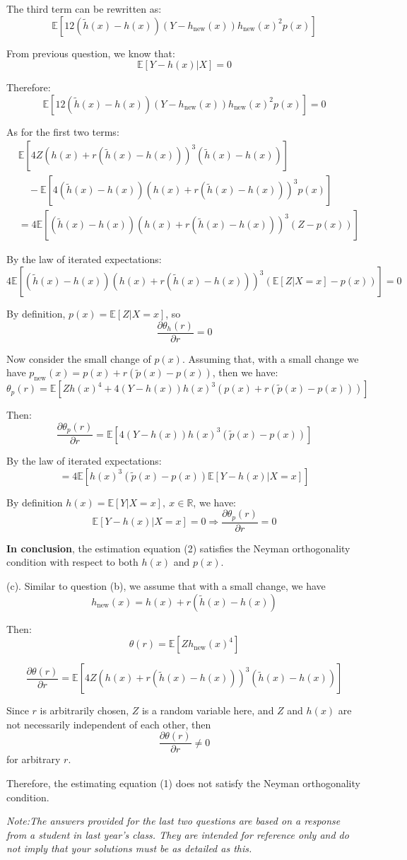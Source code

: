 \documentclass{article}
\begin{document}
The third term can be rewritten as:  
\[
\mathbb{E}[12(\tilde{h}(x) - h(x))(Y - h_{\text{new}}(x)) h_{\text{new}}(x)^2 p(x)]
\]

From previous question, we know that:  
\[
\mathbb{E}[Y - h(x)|X] = 0
\]

Therefore:  
\[
\mathbb{E}[12(\tilde{h}(x) - h(x))(Y - h_{\text{new}}(x)) h_{\text{new}}(x)^2 p(x)] = 0
\]

As for the first two terms:
\begin{align*}
&\mathbb{E}[4Z(h(x) + r(\tilde{h}(x) - h(x)))^3 (\tilde{h}(x) - h(x))] \\
&\quad - \mathbb{E}[4(\tilde{h}(x) - h(x))(h(x) + r(\tilde{h}(x) - h(x)))^3 p(x)] \\
&= 4\mathbb{E}[(\tilde{h}(x) - h(x))(h(x) + r(\tilde{h}(x) - h(x)))^3 (Z - p(x))]
\end{align*}

By the law of iterated expectations:
\[
4\mathbb{E}[(\tilde{h}(x) - h(x))(h(x) + r(\tilde{h}(x) - h(x)))^3 (\mathbb{E}[Z|X = x] - p(x))] = 0
\]

By definition, \( p(x) = \mathbb{E}[Z|X = x] \), so  
\[
\frac{\partial \theta_h(r)}{\partial r} = 0
\]

Now consider the small change of \( p(x) \).  
Assuming that, with a small change we have \( p_{\text{new}}(x) = p(x) + r(\tilde{p}(x) - p(x)) \), then we have:  
\[
\theta_p(r) = \mathbb{E}[Z h(x)^4 + 4(Y - h(x)) h(x)^3 (p(x) + r(\tilde{p}(x) - p(x)))]
\]

Then:
\[
\frac{\partial \theta_p(r)}{\partial r} = \mathbb{E}[4(Y - h(x)) h(x)^3 (\tilde{p}(x) - p(x))]
\]

By the law of iterated expectations:
\[
= 4\mathbb{E}[h(x)^3 (\tilde{p}(x) - p(x)) \mathbb{E}[Y - h(x)|X = x]]
\]

By definition \( h(x) = \mathbb{E}[Y|X = x],\ x \in \mathbb{R} \), we have:
\[
\mathbb{E}[Y - h(x)|X = x] = 0
\Rightarrow \frac{\partial \theta_p(r)}{\partial r} = 0
\]

\textbf{In conclusion}, the estimation equation (2) satisfies the Neyman orthogonality condition with respect to both \( h(x) \) and \( p(x) \).

(c). Similar to question (b), we assume that with a small change, we have  
\[
h_{\text{new}}(x) = h(x) + r(\tilde{h}(x) - h(x))
\]

Then:
\[
\theta(r) = \mathbb{E}[Z h_{\text{new}}(x)^4]
\]

\[
\frac{\partial \theta(r)}{\partial r} = \mathbb{E}\left[4Z (h(x) + r (\tilde{h}(x) - h(x)))^3 (\tilde{h}(x) - h(x))\right]
\]

Since \( r \) is arbitrarily chosen, \( Z \) is a random variable here, and \( Z \) and \( h(x) \) are not necessarily independent of each other, then  
\[
\frac{\partial \theta(r)}{\partial r} \neq 0
\]
for arbitrary \( r \).  

Therefore, the estimating equation (1) does not satisfy the Neyman orthogonality condition.

\textit{Note:The answers provided for the last two questions are based on a response from a student in last year’s class. They are intended for reference only and do not imply that your solutions must be as detailed as this.}
\end{document}
